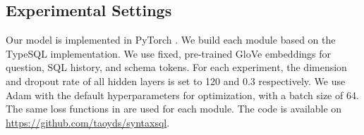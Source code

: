 \documentclass[11pt,a4paper]{article}
\begin{document}
\subsection{Experimental Settings}

Our model is implemented in PyTorch \cite{paszke2017automatic}. We build each module based on the TypeSQL \cite{Yu18} implementation. We use fixed, pre-trained GloVe \cite{pennington14} embeddings for question, SQL history, and schema tokens. For each experiment, the dimension and dropout rate of all hidden layers is set to 120 and 0.3 respectively. We use Adam \cite{Kingma15} with the default hyperparameters for optimization, with a batch size of 64. The same loss functions in \cite{Xu2017} are used for each module. The code is available on \url{https://github.com/taoyds/syntaxsql}. 












\begin{table*}[ht!]
\centering
{}
\vspace{-2mm}
\caption{Accuracy of Exact Matching on SQL queries with different hardness levels.}
\label{tab:results}
\vspace{-1mm}
\end{table*}
\end{document}
